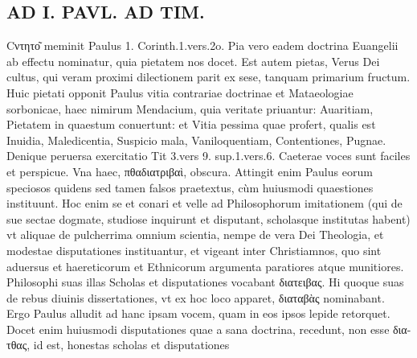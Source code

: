 \documentclass{article}
\begin{document}
\begin{pages}
\section*{AD I. PAVL. AD TIM. }
\marginpar{[ p.420 ]}\pstart Cντητο͂ meminit Paulus 1. Corinth.1.vers.2o.  \pend\pstart Pia vero eadem doctrina Euangelii ab effectu nominatur, quia pietatem nos docet. Est autem pietas, Verus Dei cultus, qui veram proximi dilectionem parit ex sese, tanquam primarium fructum.  \pend\pstart Huic pietati opponit Paulus vitia contrariae doctrinae et Mataeologiae sorbonicae, haec nimirum Mendacium, quia veritate priuantur: Auaritiam, Pietatem in quaestum conuertunt: et Vitia pessima quae profert, qualis est Inuidia, Maledicentia, Suspicio mala, Vaniloquentiam, Contentiones, Pugnae. Denique peruersa exercitatio Tit 3.vers 9. sup.1.vers.6. Caeterae voces sunt faciles et perspicue. Vna haec, πθαδιατριβαὶ, obscura. Attingit enim Paulus eorum speciosos quidens sed tamen falsos praetextus, cùm huiusmodi quaestiones instituunt. Hoc enim se et conari et velle ad Philosophorum imitationem (qui de sue sectae dogmate, studiose inquirunt et disputant, scholasque institutas habent) vt aliquae de pulcherrima omnium scientia, nempe de vera Dei Theologia, et modestae disputationes instituantur, et vigeant inter Christiamnos, quo sint aduersus et haereticorum et Ethnicorum argumenta paratiores atque  munitiores. Philosophi suas illas Scholas et disputationes vocabant διατειβας. Hi quoque  suas de rebus diuinis dissertationes, vt ex hoc loco apparet, διαταβὰς nominabant. Ergo Paulus alludit ad hanc ipsam vocem, quam in eos ipsos lepide retorquet. Docet enim huiusmodi disputationes quae a sana doctrina, recedunt, non esse δια- τθας, id est, honestas scholas et disputationes  \pend

\end{pages}
\end{document}

